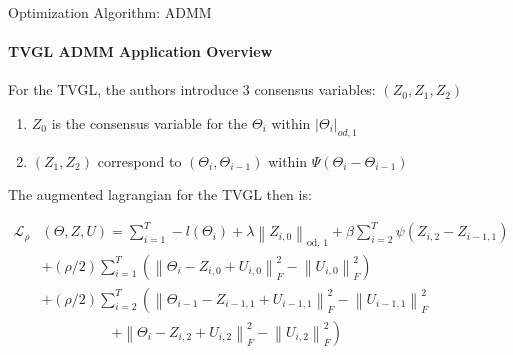 \documentclass{beamer}
\begin{document}
\begin{frame}{Optimization Algorithm: ADMM}
\framesubtitle{TVGL ADMM Application Overview}

For the TVGL, the authors introduce 3 consensus variables: $(Z_{0}, Z_{1}, Z_{2})$

\begin{enumerate}
	\item $Z_{0}$ is the consensus variable for the $\Theta_{i}$ within $|\Theta_{i}|_{od, 1}$
	\item $(Z_{1}, Z_{2})$ correspond to $(\Theta_{i}, \Theta_{i-1})$ within $\Psi(\Theta_{i} - \Theta_{i-1})$
\end{enumerate}
	
The augmented lagrangian for the TVGL then is:

\begin{align}
\nonumber \mathcal{L}_{\rho}&(\Theta, Z, U) =\sum_{i=1}^{T}-l\left(\Theta_{i}\right)+\lambda\left\|Z_{i, 0}\right\|_{\text {od, } 1}+\beta \sum_{i=2}^{T} \psi\left(Z_{i, 2}-Z_{i-1,1}\right)
\nonumber \\ &+(\rho / 2) \sum_{i=1}^{T}\left(\left\|\Theta_{i}-Z_{i, 0}+U_{i, 0}\right\|_{F}^{2}-\left\|U_{i, 0}\right\|_{F}^{2}\right)
\nonumber \\ &+(\rho / 2) \sum_{i=2}^{T}\left(\left\|\Theta_{i-1}-Z_{i-1,1}+U_{i-1,1}\right\|_{F}^{2}-\left\|U_{i-1,1}\right\|_{F}^{2}\right.
\nonumber \\ & \quad \quad \quad \quad \quad \left.+\left\|\Theta_{i}-Z_{i, 2}+U_{i, 2}\right\|_{F}^{2}-\left\|U_{i, 2}\right\|_{F}^{2}\right) \nonumber
\end{align}

\end{frame}
\end{document}
